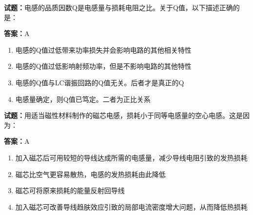 \documentclass{ctexbook}
\begin{document}





\vspace{1em}

\textbf{试题：}电感的品质因数Q是电感量与损耗电阻之比。关于Q值，以下描述正确的是： 

\textbf{答案：}A 

\begin{enumerate}[leftmargin=3em]
  \item 电感的Q值过低带来功率损失并会影响电路的其他相关特性 

  \item 电感的Q值过低影响射频功率，但是不影响电路的其他特性 

  \item 电感的Q值与LC谐振回路的Q值无关。后者才是真正的Q 

  \item 电感量确定，则Q值已笃定。二者为正比关系 

\end{enumerate}





\vspace{1em}

\textbf{试题：}用适当磁性材料制作的磁芯电感，损耗小于同等电感量的空心电感。这是因为： 

\textbf{答案：}A 

\begin{enumerate}[leftmargin=3em]
  \item 加入磁芯后可用较短的导线达成所需的电感量，减少导线电阻引致的发热损耗 

  \item 磁芯比空气更容易散热，电感的发热损耗由此降低 

  \item 磁芯可将原来损耗的能量反射回导线 

  \item 加入磁芯可改善导线趋肤效应引致的局部电流密度增大问题，从而降低热损耗 

\end{enumerate}





\vspace{1em}
\end{document}
